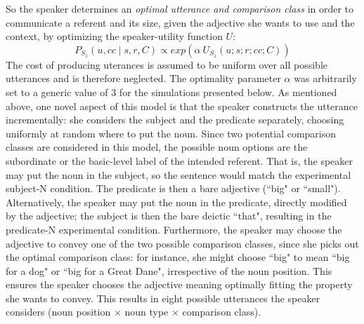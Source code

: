 So the speaker determines an \emph{optimal utterance and comparison class} in order to communicate a referent and its size, given the adjective she wants to use and the context, by optimizing the speaker-utility function $U$:
\begin{equation}
P_{S_1} (u, cc \mid s, r, C)  \propto exp(\alpha \: U_{S_1}(u; s; r; cc; C)) 
\end{equation}
The cost of producing uterances is assumed to be uniform over all possible utterances and is therefore neglected. The optimality parameter $\alpha$ was arbitrarily set to a generic value of 3 for the simulations presented below. %
As mentioned above, one novel aspect of this model is that the speaker constructs the utterance incrementally: she considers the subject and the predicate separately, choosing uniformly at random where to put the noun. Since two potential comparison classes are considered in this model, the possible noun options are the subordinate or the basic-level label of the intended referent. That is, the speaker may put the noun in the subject, so the sentence would match the experimental subject-N condition. The predicate is then a bare adjective (``big" or ``small"). Alternatively, the speaker may put the noun in the predicate, directly modified by the adjective; the subject is then the bare deictic ``that", resulting in the predicate-N experimental condition. Furthermore, the speaker may choose the adjective to convey one of the two possible comparison classes, since she picks out the optimal comparison class: for instance, she might choose ``big" to mean ``big for a dog" or ``big for a Great Dane", irrespective of the noun position. This ensures the speaker chooses the adjective meaning optimally fitting the property she wants to convey. This results in eight possible utterances the speaker considers (noun position $\times$ noun type $\times$ comparison class).  

